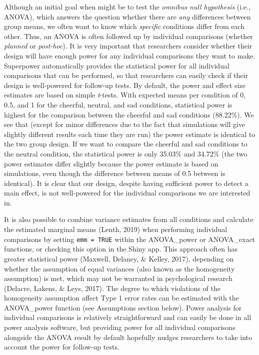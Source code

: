 \documentclass[
  ,jou,floatsintext]{apa6}
\begin{document}
Although an initial goal when might be to test the \emph{omnibus null hypothesis} (i.e., ANOVA), which answers the question whether there are \emph{any} differences between group means, we often want to know which \emph{specific} conditions differ from each other.
Thus, an ANOVA is often followed up by individual comparisons (whether \emph{planned} or \emph{post-hoc}).
It is very important that researchers consider whether their design will have enough power for any individual comparisons they want to make.
Superpower automatically provides the statistical power for all individual comparisons that can be performed, so that researchers can easily check if their design is well-powered for follow-up tests.
By default, the power and effect size estimates are based on simple \emph{t}-tests.
With expected means per condition of 0, 0.5, and 1 for the cheerful, neutral, and sad conditions, statistical power is highest for the comparison between the cheerful and sad conditions (88.22\%).
We see that (except for minor differences due to the fact that simulations will give slightly different results each time they are run) the power estimate is identical to the two group design.
If we want to compare the cheerful and sad conditions to the neutral condition, the statistical power is only 35.03\% and 34.72\% (the two power estimates differ slightly because the power estimate is based on simulations, even though the difference between means of 0.5 between is identical).
It is clear that our design, despite having sufficient power to detect a main effect, is not well-powered for the individual comparisons we are interested in.

It is also possible to combine variance estimates from all conditions and calculate the estimated marginal means (Lenth, 2019) when performing individual comparisons by setting \texttt{emm\ =\ TRUE} within the ANOVA\_power or ANOVA\_exact functions, or checking this option in the Shiny app.
This approach often has greater statistical power (Maxwell, Delaney, \& Kelley, 2017), depending on whether the assumption of equal variances (also known as the homogeneity assumption) is met, which may not be warranted in psychological research (Delacre, Lakens, \& Leys, 2017).
The degree to which violations of the homogeneity assumption affect Type 1 error rates can be estimated with the ANOVA\_power function (see Assumptions section below).
Power analysis for individual comparisons is relatively straightforward and can easily be done in all power analysis software, but providing power for all individual comparisons alongside the ANOVA result by default hopefully nudges researchers to take into account the power for follow-up tests.
\end{document}
